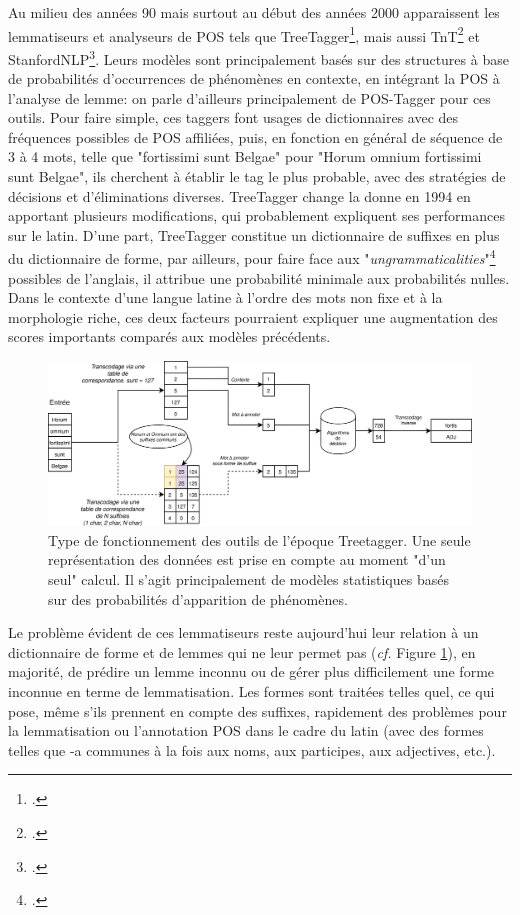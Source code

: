 Au milieu des années 90 mais surtout au début des années 2000 apparaissent les lemmatiseurs et analyseurs de POS tels que TreeTagger\footcite{schmid1994treetagger}, mais aussi TnT\footcite{brants_tnt_2000} et StanfordNLP\footcite{toutanova_feature-rich_2003}. Leurs modèles sont principalement basés sur des structures à base de probabilités d'occurrences de phénomènes en contexte, en intégrant la POS à l'analyse de lemme: on parle d'ailleurs principalement de POS-Tagger pour ces outils. Pour faire simple, ces taggers font usages de dictionnaires avec des fréquences possibles de POS affiliées, puis, en fonction en général de séquence de 3 à 4 mots, telle que "fortissimi sunt Belgae" pour "Horum omnium fortissimi sunt Belgae", ils cherchent à établir le tag le plus probable, avec des stratégies de décisions et d'éliminations diverses. TreeTagger change la donne en 1994 en apportant plusieurs modifications, qui probablement expliquent ses performances sur le latin. D'une part, TreeTagger constitue un dictionnaire de suffixes en plus du dictionnaire de forme, par ailleurs, pour faire face aux "\textit{ungrammaticalities}"\footcite[p.~2]{schmid1994treetagger} possibles de l'anglais, il attribue une probabilité minimale aux probabilités nulles. Dans le contexte d'une langue latine à l'ordre des mots non fixe et à la morphologie riche, ces deux facteurs pourraient expliquer une augmentation des scores importants comparés aux modèles précédents.

\begin{figure}[h]
    \centering
    \includegraphics[width=\linewidth]{results/lemmatisation/outils/treetagger_type.png}
    \caption{Type de fonctionnement des outils de l'époque Treetagger. Une seule représentation des données est prise en compte au moment "d'un seul" calcul. Il s'agit principalement de modèles statistiques basés sur des probabilités d'apparition de phénomènes.}
    \label{lemmatisation:outils:type-treetagger}
\end{figure}

Le problème évident de ces lemmatiseurs reste aujourd'hui leur relation à un dictionnaire de forme et de lemmes qui ne leur permet pas (\textit{cf.} Figure \ref{lemmatisation:outils:type-treetagger}), en majorité, de prédire un lemme inconnu ou de gérer plus difficilement une forme inconnue en terme de lemmatisation. Les formes sont traitées telles quel, ce qui pose, même s'ils prennent en compte des suffixes, rapidement des problèmes pour la lemmatisation ou l'annotation POS dans le cadre du latin (avec des formes telles que -a communes à la fois aux noms, aux participes, aux adjectives, etc.).%

